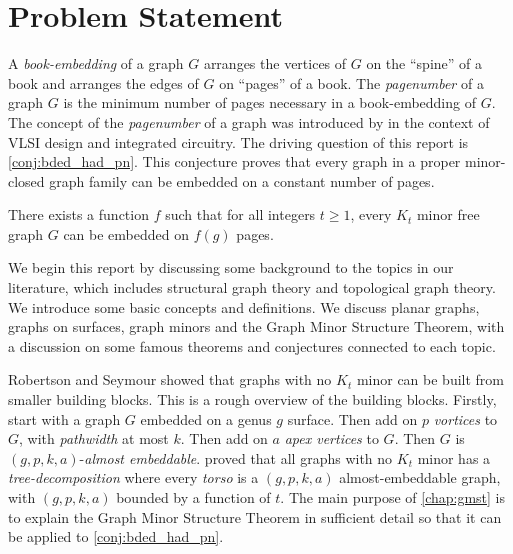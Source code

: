 \section{Problem Statement}

A \textit{book-embedding} of a graph $G$ arranges the vertices of $G$ on the ``spine'' of a book and arranges the edges of $G$ on ``pages'' of a book. The \textit{pagenumber} of a graph \(G\) is the minimum number of pages necessary in a book-embedding of \(G\). The concept of the \textit{pagenumber} of a graph was introduced by \textcite{ollmannBookThicknessVarious1973} in the context of VLSI design and integrated circuitry. 
The driving question of this report is \cref{conj:bded_had_pn}. This conjecture proves that every graph in a proper minor-closed graph family can be embedded on a constant number of pages. 
\begin{conjecture}\label{conj:bded_had_pn}
	There exists a function $f$ such that for all integers $t \geq 1$, every $K_t$ minor free graph $G$ can be embedded on $f(g)$ pages.
\end{conjecture}

We begin this report by discussing some background to the topics in our literature, which includes structural graph theory and topological graph theory. We introduce some basic concepts and definitions. We discuss planar graphs, graphs on surfaces, graph minors and the Graph Minor Structure Theorem, with a discussion on some famous theorems and conjectures connected to each topic. 

Robertson and Seymour showed that graphs with no \(K_t\) minor can be built from smaller building blocks. This is a rough overview of the building blocks. Firstly, start with a graph \(G\) embedded on a genus \(g\) surface. Then add on \(p\) \textit{vortices} to \(G\), with \textit{pathwidth} at most \(k\). Then add on \(a\) \textit{apex vertices} to \(G\). Then \(G\) is \((g, p, k, a)\)-\textit{almost embeddable}. \textcite{robertsonGraphMinorsXVI2003} proved that all graphs with no \(K_t\) minor has a \textit{tree-decomposition} where every \textit{torso} is a \((g, p, k, a)\) almost-embeddable graph, with \((g, p, k, a)\) bounded by a function of \(t\). The main purpose of \cref{chap:gmst} is to explain the Graph Minor Structure Theorem in sufficient detail so that it can be applied to \cref{conj:bded_had_pn}.

